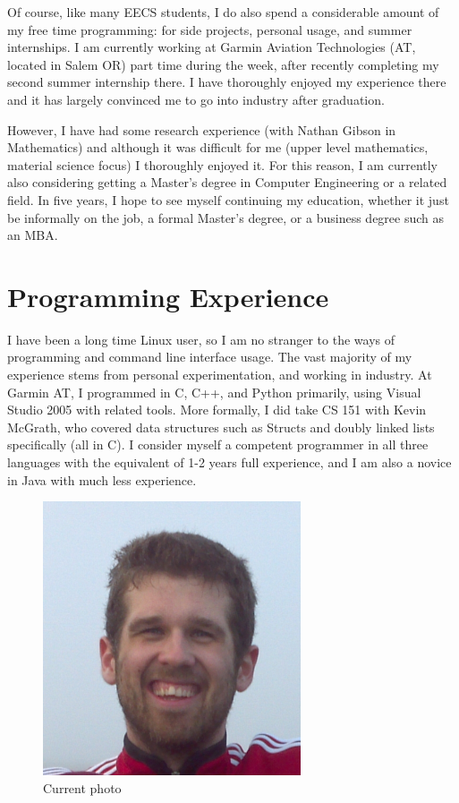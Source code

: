 \documentclass[12pt,letterpaper]{article}
\begin{document}
Of course, like many EECS students, I do also spend a considerable amount of my
free time programming: for side projects, personal usage, and summer internships.
I am currently working at Garmin Aviation Technologies (AT, located in Salem OR)
part time during the week, after recently completing my second summer internship
there. I have thoroughly enjoyed my experience there and it has largely convinced
me to go into industry after graduation.

However, I have had some research experience (with Nathan Gibson in Mathematics) and
although it was difficult for me (upper level mathematics, material science focus)
I thoroughly enjoyed it. For this reason, I am currently also considering getting
a Master's degree in Computer Engineering or a related field. In five years, I
hope to see myself continuing my education, whether it just be informally on the job,
a formal Master's degree, or a business degree such as an MBA.

\section{Programming Experience}

I have been a long time Linux user, so I am no stranger to the ways of programming
and command line interface usage. The vast majority of my experience stems from
personal experimentation, and working in industry. At Garmin AT, I programmed
in C, C++, and Python primarily, using Visual Studio 2005 with related tools. More
formally, I did take CS 151 with Kevin McGrath, who covered data structures such
as Structs and doubly linked lists specifically (all in C). I consider myself a competent
programmer in all three languages with the equivalent of 1-2 years full experience,
and I am also a novice in Java with much less experience.


\begin{figure}
\centering
\includegraphics[width=3in]{face.jpg}
\caption{Current photo}
\end{figure}


\end{document}
